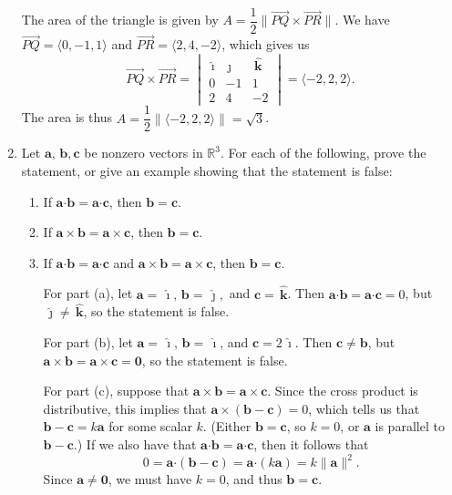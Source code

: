 \documentclass[12pt]{article}
\newcommand{\points}[1]{\marginpar{\hspace{24pt}[#1]}}
\newcommand{\R}{\mathbb{R}}
\newcommand{\aaa}{\mathbf{a}}
\newcommand{\bbb}{\mathbf{b}}
\newcommand{\ccc}{\mathbf{c}}
\newcommand{\len}[1]{\lVert #1\rVert}
\newcommand{\ivec}{\,\boldsymbol{\hat{\imath}}}
\newcommand{\jvec}{\,\boldsymbol{\hat{\jmath}}}
\newcommand{\kvec}{\,\boldsymbol{\hat{k}}}
\newcommand{\dotp}{\boldsymbol{\cdot}}
\begin{document}
\begin{enumerate}
\bigskip

The area of the triangle is given by $A = \dfrac{1}{2}\len{\overrightarrow{PQ}\times\overrightarrow{PR}}$. We have $\overrightarrow{PQ}=\langle 0,-1,1\rangle$ and $\overrightarrow{PR} = \langle 2,4,-2\rangle$, which gives us
\[
\overrightarrow{PQ}\times\overrightarrow{PR} = \begin{vmatrix}
\ivec &\jvec & \kvec\\ 0&-1&1\\ 2&4&-2
\end{vmatrix} = \langle -2,2,2\rangle.
\]
The area is thus $A=\dfrac{1}{2}\len{\langle -2,2,2\rangle} = \sqrt{3}$.

\bigskip

\bigskip

\bigskip

\bigskip


\item Let $\mathbf{a},\,\mathbf{b},\mathbf{c}$ be nonzero vectors in $\R^3$. For each of the following, prove the statement, or give an example showing that the statement is false: \points{6}
\begin{enumerate}
\item If $\aaa\dotp\bbb = \aaa\dotp\ccc$, then $\bbb=\ccc$.
\item If $\aaa\times\bbb = \aaa\times\ccc$, then $\bbb=\ccc$.
\item If $\aaa\dotp\bbb = \aaa\dotp\ccc$ and $\aaa\times\bbb = \aaa\times\ccc$, then $\bbb=\ccc$.



\bigskip

For part (a), let $\aaa = \ivec, \, \bbb = \jvec,$ and $\ccc = \kvec$. Then $\aaa\dotp\bbb = \aaa\dotp\ccc = 0$, but $\jvec\neq \kvec$, so the statement is false.

For part (b), let $\aaa = \ivec,\, \bbb = \ivec$, and $\ccc = 2\ivec$. Then $\ccc\neq \bbb$, but $\aaa\times\bbb = \aaa\times\ccc = \mathbf{0}$, so the statement is false.

For part (c), suppose that $\aaa\times\bbb=\aaa\times\ccc$. Since the cross product is distributive, this implies that $\aaa\times(\bbb-\ccc)=0$, which tells us that $\bbb-\ccc = k\aaa$ for some scalar $k$. (Either $\bbb=\ccc$, so $k=0$, or $\aaa$ is parallel to $\bbb-\ccc$.) If we also have that $\aaa\dotp\bbb = \aaa\dotp\ccc$, then it follows that 
\[
0 = \aaa\dotp(\bbb-\ccc) = \aaa\dotp (k\aaa) = k\len{\aaa}^2.
\]
Since $\aaa\neq \mathbf{0}$, we must have $k=0$, and thus $\bbb=\ccc$. 
\end{enumerate}

\end{enumerate}
\newpage
\end{document}
